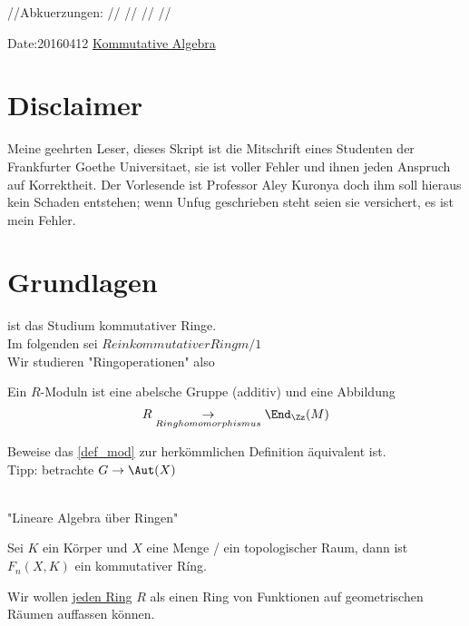 //Abkuerzungen:
//\providecommand{\idealin}{dreieck nach rechts}
//\providecommand{\bzgl}{bez\"uglich}
//\providecommand{\prim}{\text{prim}}
//\providecommand{\injto}{\to mit haken}

Date:20160412
\underline{Kommutative Algebra}
\section{Disclaimer}
Meine geehrten Leser,
dieses Skript ist die Mitschrift eines Studenten der Frankfurter Goethe Universitaet, sie ist voller Fehler und ihnen jeden Anspruch auf Korrektheit.
Der Vorlesende ist Professor Aley Kuronya doch ihm soll hieraus kein Schaden entstehen; wenn Unfug geschrieben steht seien sie versichert, es ist mein Fehler.
\section{Grundlagen}
ist das Studium kommutativer Ringe.\\
Im folgenden sei \( R ein kommutativer Ring m/ 1 \) \\
Wir studieren "Ringoperationen" also  \\
\begin{defn}[Moduln] \label{def_mod}
Ein \(R\)-Moduln ist eine abelsche Gruppe (additiv) und eine Abbildung 
\[R \underset{Ringhomomorphismus}{\to} \End_\Zz(M) \]
\end{defn}
\begin{hausaufgabe}
Beweise das \ref{def_mod} zur herk\"ommlichen Definition \"aquivalent ist. \\
Tipp: betrachte \( G \to \Aut(X) \)
\end{hausaufgabe}
\\
"Lineare Algebra \"uber Ringen" \\
\begin{bsp}
Sei \( K \)  ein K\"orper und \( X \) eine Menge / ein topologischer Raum, dann ist \( F_n (X,K ) \) ein kommutativer Ríng.
\end{bsp}
\begin{Ziel}
Wir wollen \underline{jeden Ring} \( R \) als einen Ring von Funktionen auf geometrischen R\"aumen auffassen k\"onnen. \\
\end{Ziel}
